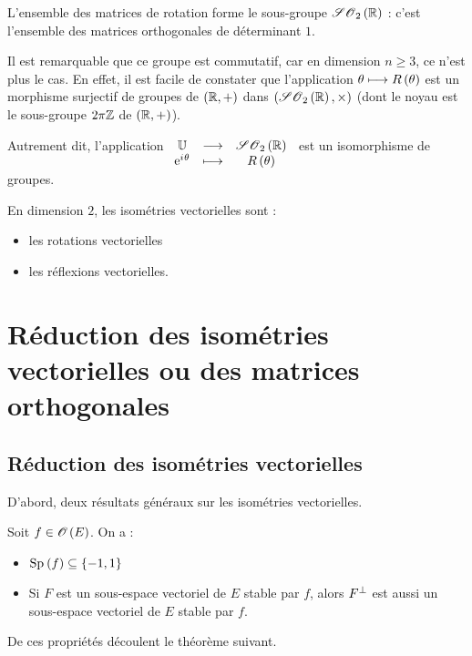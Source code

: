 L'ensemble des matrices de rotation forme le sous-groupe \(\SO{2}[\R]\) : c'est l'ensemble des matrices orthogonales de déterminant \(1\).

Il est remarquable que ce groupe est commutatif, car en dimension \(n\geq3\), ce n'est plus le cas. En effet, il est facile de constater que l'application \(\theta\longmapsto R\left(\theta\right)\) est un morphisme surjectif de groupes de \(\groupe{\R}\) dans \(\groupe{\SO{2}[\R]}[\times]\) (dont le noyau est le sous-groupe \(2\pi\mathbb{Z}\) de \(\groupe{\R}\)).

Autrement dit, l'application \(\fonctionlambda{\U}{\SO{2}[\R]}{\e{\i\theta}}{R\paren{\theta}}\) est un isomorphisme de groupes.

\begin{prop}
En dimension \(2\), les isométries vectorielles sont :

\begin{itemize}
    \item les rotations vectorielles \\
    \item les réflexions vectorielles.
\end{itemize}
\end{prop}

\section{Réduction des isométries vectorielles ou des matrices orthogonales}

\subsection{Réduction des isométries vectorielles}

D'abord, deux résultats généraux sur les isométries vectorielles.

\begin{prop}
Soit \(f\in\Orth{}[E]\). On a :

\begin{itemize}
    \item \(\Sp{f}\subset\accol{-1,1}\) \\
    \item Si \(F\) est un sous-espace vectoriel de \(E\) stable par \(f\), alors \(F^{\perp}\) est aussi un sous-espace vectoriel de \(E\) stable par \(f\).
\end{itemize}
\end{prop}

De ces propriétés découlent le théorème suivant.


